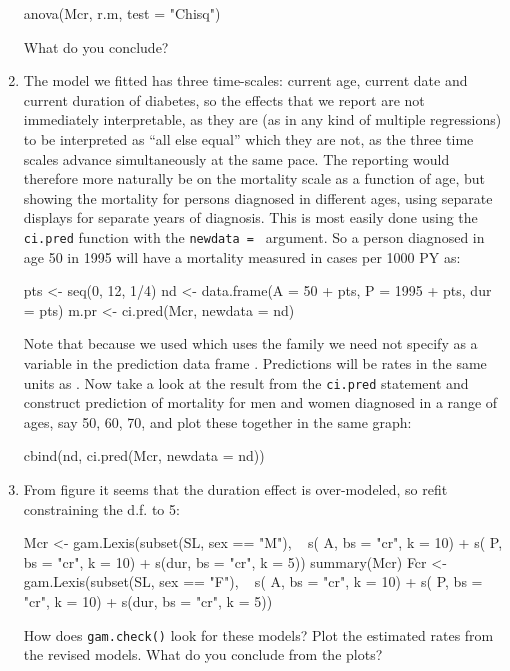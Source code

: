 \begin{enumerate}[resume]
\begin{Schunk}
\begin{Sinput}
 anova(Mcr, r.m, test = "Chisq")
\end{Sinput}
\end{Schunk}
What do you conclude?
\item The model we fitted has three time-scales: current age, current
  date and current duration of diabetes, so the effects that we report
  are not immediately interpretable, as they are (as in any kind of
  multiple regressions) to be interpreted as ``all else equal'' which
  they are not, as the three time scales advance simultaneously at the
  same pace.
  The reporting would therefore more naturally be on the
  mortality scale as a function of age, but showing the mortality
  for persons diagnosed in different ages, using separate displays
  for separate years of diagnosis.
  This is most easily done using the \texttt{ci.pred} function with
  the \texttt{newdata = } argument. So a person diagnosed in age 50 in
  1995 will have a mortality measured in cases per 1000 PY as:
\begin{Schunk}
\begin{Sinput}
 pts <- seq(0, 12, 1/4)
 nd <- data.frame(A =   50 + pts,
                  P = 1995 + pts,
                dur =        pts)
 m.pr <- ci.pred(Mcr, newdata = nd)
\end{Sinput}
\end{Schunk}
  Note that because we used  which uses
  the family we need not specify  as a
  variable in the prediction data frame . Predictions will
  be rates in the same units as .
  Now take a look at the result from the \texttt{ci.pred} statement and
  construct prediction of mortality for men and women diagnosed in a
  range of ages, say 50, 60, 70, and plot these together in the same
  graph:
\begin{Schunk}
\begin{Sinput}
 cbind(nd, ci.pred(Mcr, newdata = nd))
\end{Sinput}
\end{Schunk}
\item From figure it seems that the duration effect is
over-modeled, so refit constraining the d.f. to 5:
\begin{Schunk}
\begin{Sinput}
 Mcr <- gam.Lexis(subset(SL, sex == "M"),
                  ~ s(  A, bs = "cr", k = 10) +
                    s(  P, bs = "cr", k = 10) +
                    s(dur, bs = "cr", k = 5))
 summary(Mcr)
 Fcr <- gam.Lexis(subset(SL, sex == "F"),
                  ~ s(  A, bs = "cr", k = 10) +
                    s(  P, bs = "cr", k = 10) +
                    s(dur, bs = "cr", k = 5))
\end{Sinput}
\end{Schunk}
How does \texttt{gam.check()} look for these models?
Plot the estimated rates from the revised models.
What do you conclude from the plots?
\end{enumerate}
